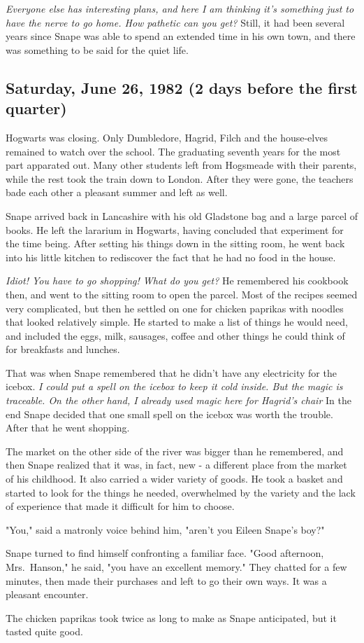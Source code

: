\emph{Everyone else has interesting plans, and here I am thinking it's something just to have the nerve to go home. How pathetic can you get?} Still, it had been several years since Snape was able to spend an extended time in his own town, and there was something to be said for the quiet life.

\subsection{Saturday, June 26, 1982 (2 days before the first quarter)}

Hogwarts was closing. Only Dumbledore, Hagrid, Filch and the house-elves remained to watch over the school. The graduating seventh years for the most part apparated out. Many other students left from Hogsmeade with their parents, while the rest took the train down to London. After they were gone, the teachers bade each other a pleasant summer and left as well.

Snape arrived back in Lancashire with his old Gladstone bag and a large parcel of books. He left the lararium in Hogwarts, having concluded that experiment for the time being. After setting his things down in the sitting room, he went back into his little kitchen to rediscover the fact that he had no food in the house.

\emph{Idiot! You have to go shopping! What do you get?} He remembered his cookbook then, and went to the sitting room to open the parcel. Most of the recipes seemed very complicated, but then he settled on one for chicken paprikas with noodles that looked relatively simple. He started to make a list of things he would need, and included the eggs, milk, sausages, coffee and other things he could think of for breakfasts and lunches.

That was when Snape remembered that he didn't have any electricity for the icebox. \emph{I could put a spell on the icebox to keep it cold inside. But the magic is traceable. On the other hand, I already used magic here for Hagrid's chair{\el}} In the end Snape decided that one small spell on the icebox was worth the trouble. After that he went shopping.

The market on the other side of the river was bigger than he remembered, and then Snape realized that it was, in fact, new - a different place from the market of his childhood. It also carried a wider variety of goods. He took a basket and started to look for the things he needed, overwhelmed by the variety and the lack of experience that made it difficult for him to choose.

"You," said a matronly voice behind him, "aren't you Eileen Snape's boy?"

Snape turned to find himself confronting a familiar face. "Good afternoon, Mrs.~Hanson," he said, "you have an excellent memory." They chatted for a few minutes, then made their purchases and left to go their own ways. It was a pleasant encounter.

The chicken paprikas took twice as long to make as Snape anticipated, but it tasted quite good.


